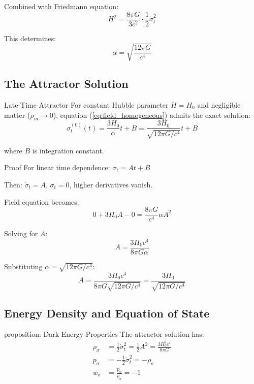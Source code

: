 \documentclass[11pt,a4paper]{article}
\theoremstyle{definition}
\theoremstyle{remark}
\begin{document}
	Combined with Friedmann equation:
	\begin{equation}
		H^2 = \frac{8\pi G}{3c^2}\cdot\frac{1}{2}\dot{\sigma}_t^2
	\end{equation}
	
	This determines:
	\begin{equation}
		\alpha = \sqrt{\frac{12\pi G}{c^4}}
	\end{equation}
	
	\subsection{The Attractor Solution}
	
	Late-Time Attractor
		For constant Hubble parameter $H = H_0$ and negligible matter ($\rho_m \to 0$), equation (\ref{eq:field_homogeneous}) admits the exact solution:
		\begin{equation}\label{eq:attractor}
			\boxed{\sigma_t^{(0)}(t) = \frac{3H_0}{\alpha}t + B = \frac{3H_0}{\sqrt{12\pi G/c^4}}t + B}
		\end{equation}
		
		where $B$ is integration constant.
	
	Proof
		For linear time dependence: $\sigma_t = At + B$
		
		Then: $\dot{\sigma}_t = A$, $\ddot{\sigma}_t = 0$, higher derivatives vanish.
		
		Field equation becomes:
		\begin{equation}
			0 + 3H_0 A - 0 = \frac{8\pi G}{c^4}\alpha A^2
		\end{equation}
		
		Solving for $A$:
		\begin{equation}
			A = \frac{3H_0c^4}{8\pi G\alpha}
		\end{equation}
		
		Substituting $\alpha = \sqrt{12\pi G/c^4}$:
		\begin{equation}
			A = \frac{3H_0c^4}{8\pi G\sqrt{12\pi G/c^4}} = \frac{3H_0}{\sqrt{12\pi G/c^4}}
		\end{equation}
	
	\subsection{Energy Density and Equation of State}
	
	proposition: Dark Energy Properties
		The attractor solution has:
		\begin{align}
			\rho_\sigma &= \frac{1}{2}\dot{\sigma}_t^2 = \frac{1}{2}A^2 = \frac{3H_0^2c^4}{8\pi G}\\
			p_\sigma &= -\frac{1}{2}\dot{\sigma}_t^2 = -\rho_\sigma\\
			w_\sigma &= \frac{p_\sigma}{\rho_\sigma} = -1
		\end{align}
	
\end{document}
